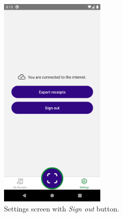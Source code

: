 \documentclass[
  digital, %
  table,   %
  oneside, %
  lof,     %
  lot,     %
]{fithesis3}
\newcommand\half{0.45}
\begin{document}
\begin{figure}
    \begin{center}
        \includegraphics[width=\half\textwidth]{figures/screens/android/light/settings_screen}
    \end{center}
    \caption{Settings screen with \textit{Sign out} button.}
    \label{fig:settings_screen}
\end{figure}
\end{document}
